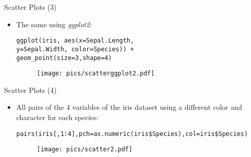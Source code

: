 \documentclass[handout]{beamer}
\begin{document}
\begin{frame}[fragile]{Scatter Plots (3)}
\scriptsize{
\begin{itemize}
 \item The same using \emph{ggplot2}:
 \begin{verbatim}
ggplot(iris, aes(x=Sepal.Length,
y=Sepal.Width, color=Species)) + 
geom_point(size=3,shape=4)
 \end{verbatim}

  \begin{figure}[h!]
	\centering
	\texttt{[image: pics/scatterggplot2.pdf]}		
\end{figure} 
 
 
\end{itemize}




}
\end{frame}


\begin{frame}[fragile]{Scatter Plots (4)}
\scriptsize{
\begin{itemize}
 \item All pairs of the 4 variables of the iris dataset using a different color and character for each species:
 \begin{verbatim}
pairs(iris[,1:4],pch=as.numeric(iris$Species),col=iris$Species)
 \end{verbatim}

  \begin{figure}[h!]
	\centering
	\texttt{[image: pics/scatter2.pdf]}		
\end{figure} 
 
 
\end{itemize}

}
 
\end{frame}
\end{document}
